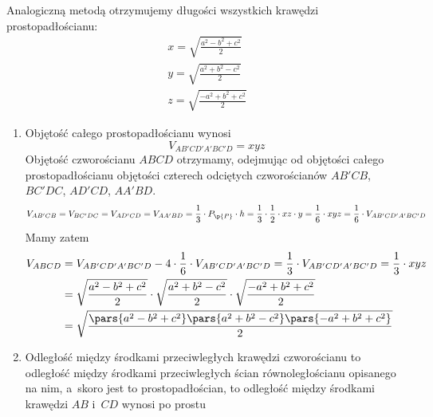 Analogiczną metodą otrzymujemy długości wszystkich krawędzi prostopadłościanu:
\begin{gather*}
    x = \sqrt{\frac{a^2 - b^2 + c^2}{2}}\\
    y = \sqrt{\frac{a^2 + b^2 - c^2}{2}}\\
    z = \sqrt{\frac{-a^2 + b^2 + c^2}{2}}
\end{gather*}
\begin{enumerate}[label={\alph*)}]
    \item Objętość całego prostopadłościanu wynosi
        \begin{equation*}
            V_{AB'CD'A'BC'D} = xyz
        \end{equation*}
        Objętość czworościanu \(ABCD\) otrzymamy, odejmując od objętości całego prostopadłościanu objętości czterech odciętych czworościanów \(AB'CB\), \(BC'DC\), \(AD'CD\), \(AA'BD\).
        \begin{equation*}
            V_{AB'CB}
            = V_{BC'DC}
            = V_{AD'CD}
            = V_{AA'BD}
            = \frac{1}{3} \cdot P_\p{P} \cdot h
            = \frac{1}{3} \cdot \frac{1}{2} \cdot xz \cdot y
            = \frac{1}{6} \cdot xyz
            = \frac{1}{6} \cdot V_{AB'CD'A'BC'D}
        \end{equation*}
        \begin{equation*}
        \end{equation*}
        Mamy zatem
        \begin{equation*}
            \begin{split}
                V_{ABCD}
                &= V_{AB'CD'A'BC'D} - 4 \cdot \frac{1}{6} \cdot V_{AB'CD'A'BC'D}
                = \frac{1}{3} \cdot V_{AB'CD'A'BC'D}
                = \frac{1}{3} \cdot xyz\\
                &= \sqrt{\frac{a^2 - b^2 + c^2}{2}} \cdot \sqrt{\frac{a^2 + b^2 - c^2}{2}} \cdot \sqrt{\frac{-a^2 + b^2 + c^2}{2}}\\
                &= \sqrt{\frac{\pars{a^2 - b^2 + c^2}\pars{a^2 + b^2 - c^2}\pars{-a^2 + b^2 + c^2}}{2}}
            \end{split}
        \end{equation*}
    \item Odległość między środkami przeciwległych krawędzi czworościanu to odległość między środkami przeciwległych ścian równoległościanu opisanego na nim, a~skoro jest to prostopadłościan, to odległość między środkami krawędzi \(AB\) i~\(CD\) wynosi po prostu
        \begin{equation*}

\end{equation*}
\end{enumerate}

